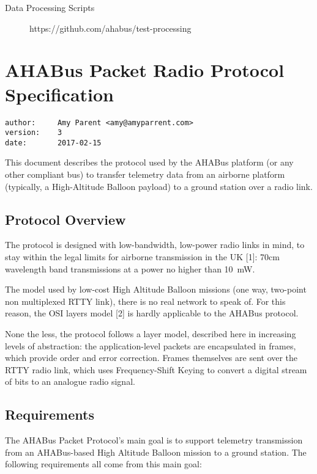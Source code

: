 \begin{appendices}
\begin{description}
\item[Data Processing Scripts] https://github.com/ahabus/test-processing
\end{description}

\chapter{AHABus Packet Radio Protocol Specification}\label{apx:protocol-radio}

\begin{verbatim}
author:     Amy Parent <amy@amyparrent.com>
version:    3
date:       2017-02-15
\end{verbatim}

This document describes the protocol used by the AHABus platform (or any
other compliant bus) to transfer telemetry data from an airborne
platform (typically, a High-Altitude Balloon payload) to a ground
station over a radio link.

\section{Protocol Overview}\label{protocol-overview}

The protocol is designed with low-bandwidth, low-power radio links in
mind, to stay within the legal limits for airborne transmission in the
UK {[}1{]}: 70cm wavelength band transmissions at a power no higher than
10~mW.

The model used by low-cost High Altitude Balloon missions (one way,
two-point non multiplexed RTTY link), there is no real network to speak
of. For this reason, the OSI layers model {[}2{]} is hardly applicable
to the AHABus protocol.

None the less, the protocol follows a layer model, described here in
increasing levels of abstraction: the application-level packets are
encapsulated in frames, which provide order and error correction. Frames
themselves are sent over the RTTY radio link, which uses Frequency-Shift
Keying to convert a digital stream of bits to an analogue radio signal.

\section{Requirements}\label{requirements}

The AHABus Packet Protocol's main goal is to support telemetry
transmission from an AHABus-based High Altitude Balloon mission to a
ground station. The following requirements all come from this main goal:


\end{appendices}

